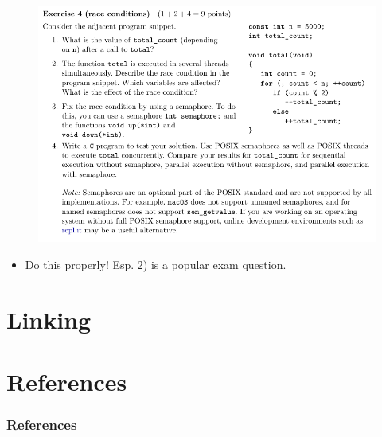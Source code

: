 \documentclass[10pt]{beamer}
\begin{document}
\begin{frame}{}
         \begin{figure}
          \includegraphics[keepaspectratio, width=\textwidth, height=\textheight]{img/ex8_103.png} \\
        \end{figure}
        \begin{itemize}
         \item Do this properly! Esp. 2) is a popular exam question.
        \end{itemize}
        \framebreak 
\end{frame}

\section*{Linking}
\frame{\sectionpage}
    

\section{References}
    \begin{frame}[allowframebreaks]
      \frametitle{References}
      \begin{tiny}
      \nocite{*}
      \printbibliography
      \end{tiny}
    \end{frame}
\end{document}
